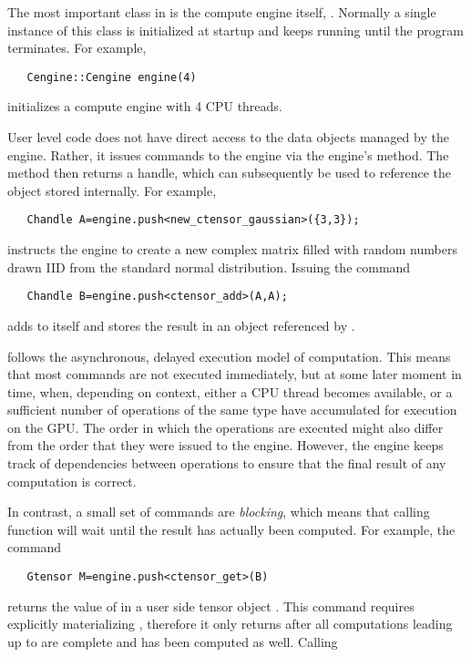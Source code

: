 The most important class in \Cengine{} is the compute engine itself, . 
Normally a single instance of this class is initialized at startup and keeps running until 
the program terminates. For example, 

\texttt{~~~Cengine::Cengine engine(4)}

initializes a compute engine with 4 CPU threads. 

User level code does not have direct access to the data objects managed by the engine. 
Rather, it issues commands to the engine via the engine's  method. 
The  method then returns a handle, which can subsequently be used to reference the object 
stored internally. For example, 

\texttt{~~~Chandle A=engine.push<new\_ctensor\_gaussian>(\{3,3\});}

instructs the engine to create a new  complex matrix filled with random numbers 
drawn IID from the standard normal distribution. Issuing the command 

\texttt{~~~Chandle B=engine.push<ctensor\_add>(A,A);}

adds  to itself and stores the result in an object referenced by . 

\Cengine{} follows the asynchronous, delayed execution model of computation. This means that most  
commands are not executed immediately, but at some later moment in time, when,  
depending on context, either a CPU thread becomes available, or a sufficient number of operations 
of the same type have accumulated for execution on the GPU. 
The order in which the operations are executed might also differ from the order that they 
were issued to the engine. 
However, the engine keeps track of dependencies between operations to ensure that the final result of 
any computation is correct. 
 

In contrast, a small set of commands are \emph{blocking}, which means that calling function will  
wait until the result has actually been computed. For example, the command 

\texttt{~~~Gtensor M=engine.push<ctensor\_get>(B)}

returns the value of  in a user side tensor object . This command requires 
explicitly materializing , therefore it only returns after all computations leading up to  
are complete and  has been computed as well. Calling 

